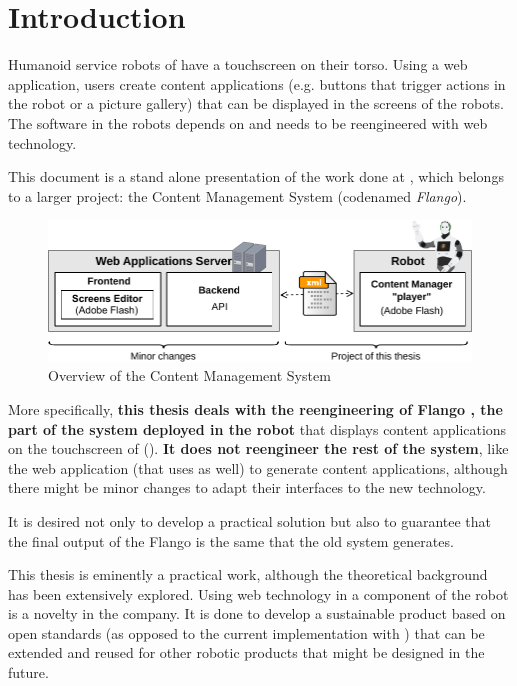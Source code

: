 \chapter{Introduction}

Humanoid service robots of \company have a touchscreen on their torso.
Using a web application, users create content applications (e.g. buttons that trigger actions in the robot or a picture gallery) that can be displayed in the screens of the robots.
The software in the robots depends on \flash and needs to be reengineered with web technology.

This document is a stand alone presentation of the work done at \company , which belongs to a larger project: the Content Management System (codenamed \textit{Flango}).
\begin{figure}[htb]
    \centering
    \includegraphics{figures/intro-system-overview.pdf}
    \caption{Overview of the Content Management System}
    \label{fig:intro-system-overview}
\end{figure}
More specifically, \textbf{this thesis deals with the reengineering of Flango \cm , the part of the system deployed \textbf{in the robot}} that displays content applications on the touchscreen of  ().
\textbf{It does not reengineer the rest of the system}, like the web application (that uses \flash as well) to generate content applications, although there might be minor changes to adapt their interfaces to the new technology.

It is desired not only to develop a practical solution but also to guarantee that the final output of the Flango \cm is the same that the old system generates.

This thesis is eminently a practical work, although the theoretical background has been extensively explored. 
Using web technology in a component of the robot is a novelty in the company. 
It is done to develop a sustainable product based on open standards (as opposed to the current implementation with \flash) that can be extended and reused for other robotic products that might be designed in the future.

